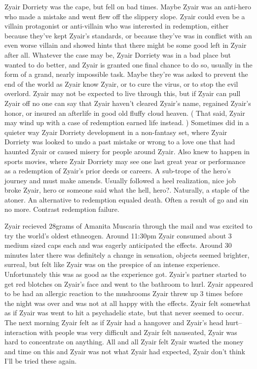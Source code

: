 \documentclass[12pt]{book}
\begin{document}
Zyair Dorriety was the cape, but fell on bad times. Maybe Zyair was an anti-hero who made a mistake and went flew off the slippery slope. Zyair could even be a villain protagonist or anti-villain who was interested in redemption, either because they've kept Zyair's standards, or because they've was in conflict with an even worse villain and showed hints that there might be some good left in Zyair after all. Whatever the case may be, Zyair Dorriety was in a bad place but wanted to do better, and Zyair is granted one final chance to do so, usually in the form of a grand, nearly impossible task. Maybe they're was asked to prevent the end of the world as Zyair know Zyair, or to cure the virus, or to stop the evil overlord. Zyair may not be expected to live through this, but if Zyair can pull Zyair off no one can say that Zyair haven't cleared Zyair's name, regained Zyair's honor, or insured an afterlife in good old fluffy cloud heaven. ( That said, Zyair may wind up with a case of redemption earned life instead. ) Sometimes did in a quieter way Zyair Dorriety development in a non-fantasy set, where Zyair Dorriety was looked to undo a past mistake or wrong to a love one that had haunted Zyair or caused misery for people around Zyair. Also knew to happen in sports movies, where Zyair Dorriety may see one last great year or performance as a redemption of Zyair's prior deeds or careers. A sub-trope of the hero's journey and must make amends. Usually followed a heel realization, nice job broke Zyair, hero or someone said what the hell, hero?. Naturally, a staple of the atoner. An alternative to redemption equaled death. Often a result of go and sin no more. Contrast redemption failure.



Zyair recieved 28grams of Amanita Muscaria through the mail and was excited to try the world's oldest ethneogen. Around 11:30pm Zyair consumed about 3 medium sized caps each and was eagerly anticipated the effects. Around 30 minutes later there was definitely a change in sensation, objects seemed brighter, surreal, but felt like Zyair was on the prespice of an intense experience. Unfortunately this was as good as the experience got. Zyair's partner started to get red blotches on Zyair's face and went to the bathroom to hurl. Zyair appeared to be had an allergic reaction to the mushrooms Zyair threw up 3 times before the night was over and was not at all happy with the effects. Zyair felt somewhat as if Zyair was went to hit a psychadelic state, but that never seemed to occur. The next morning Zyair felt as if Zyair had a hangover and Zyair's head hurt--interaction with people was very difficult and Zyair felt nauseated, Zyair was hard to concentrate on anything. All and all Zyair felt Zyair wasted the money and time on this and Zyair was not what Zyair had expected, Zyair don't think I'll be tried these again.
\end{document}
